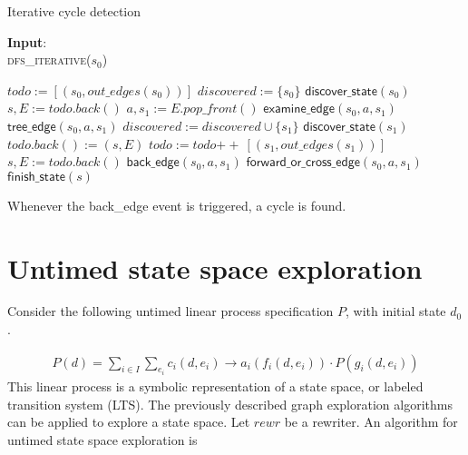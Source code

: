 \documentclass{article}
\newcommand{\concat}{\ensuremath{+\!\!+\:}}
\begin{document}
\begin{algorithm}
\small
\caption{Iterative cycle detection}
\vspace*{1ex}
{\textbf{Input}:} \\
\textsc{dfs\_iterative}($s_0$)
\begin{algorithmic}[1]
\State $todo := [(s_0, out\_edges(s_0))]$
\State $discovered := \{ s_0 \}$
\State $\textsf{discover\_state}(s_0)$
\EndWhile
  \State $s, E := todo.back()$
    \State $a, s_1 := E.pop\_front()$
    \State $\textsf{examine\_edge}(s_0, a, s_1)$
      \State $\textsf{tree\_edge}(s_0, a, s_1)$
      \State $discovered := discovered \cup \{ s_1 \}$
      \State $\textsf{discover\_state}(s_1)$
      \State $todo.back() := (s, E)$
      \State $todo := todo \concat [(s_1, out\_edges(s_1))]$
      \State $s, E := todo.back()$
      \State $\textsf{back\_edge}(s_0, a, s_1)$
    \Else
      \State $\textsf{forward\_or\_cross\_edge}(s_0, a, s_1)$
    \EndIf
  \EndWhile
  \State $\textsf{finish\_state}(s)$
\end{algorithmic}
\end{algorithm}

Whenever the \textsf{back\_edge} event is triggered, a cycle is found.

\newpage
\section{Untimed state space exploration}
Consider the following untimed linear process specification $P$, with initial state $d_0$.

\[
\begin{array}{l}
P(d)=
\sum\limits_{i\in I}\sum\limits_{e_i}c_i(d, e_i)\rightarrow a_i(f_i(d,e_i)) \cdot P(g_i(d,e_i))
\end{array}
\]
This linear process is a symbolic representation of a state space, or labeled transition system
(LTS). The previously described graph exploration algorithms can be applied to explore a
state space. Let $rewr$ be a rewriter. An algorithm for untimed state space exploration is
\end{document}
